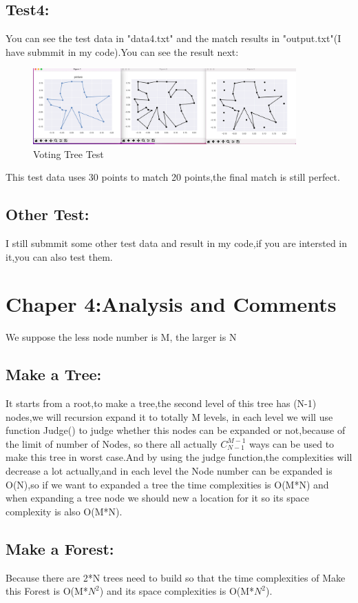 \documentclass[12pt]{article}
\begin{document}
\subsection*{Test4:}
You can see the test data in "data4.txt" and the match results in "output.txt"(I have submmit in my code).You can see the result next:
    \begin{figure}[H]
	\centering
	\includegraphics[width=0.9\textwidth]{5.png}
	\caption{\label{pr}Voting Tree Test}
	\end{figure}
This test data uses 30 points to match 20 points,the final match is still perfect.

\subsection*{Other Test:}
I still submmit some other test data and result in my code,if you are intersted in it,you can also test them.

\section*{Chaper 4:Analysis and Comments}
We suppose the less node number is M, the larger is N

\subsection*{Make a Tree:}

It starts from a root,to make a tree,the second level of this tree has (N-1) nodes,we will recursion expand it to totally M levels,
in each level we will use function Judge() to judge whether this nodes can be expanded or not,because of the limit of number of Nodes,
so there all actually $C_{N-1}^{M-1}$ ways can be used to make this tree in worst case.And by using the judge function,the complexities
will decrease a lot actually,and in each level the Node number can be expanded is O(N),so if we want to expanded a tree the time complexities 
is O(M*N) and when expanding a tree node we should new a location for it so its space complexity is also O(M*N).

\subsection*{Make a Forest:}
Because there are 2*N trees need to build so that the time complexities of Make this Forest is O(M*$N^{2}$) and its space complexities is O(M*$N^{2}$).
\end{document}
